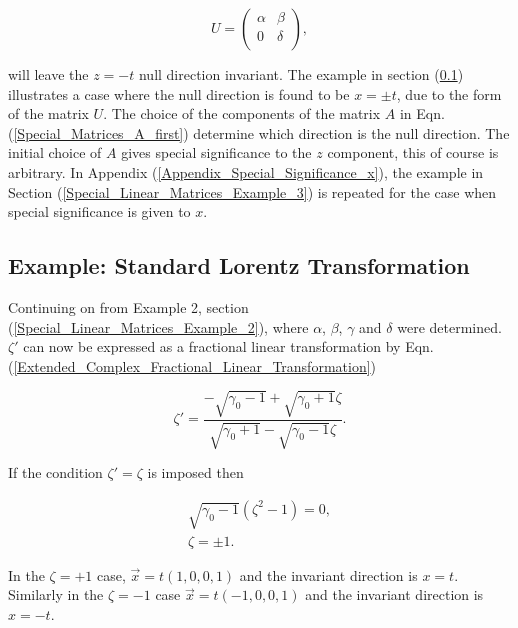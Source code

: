 \begin{equation*}   
U = 
\left(
\begin{array}{cc}
\alpha & \beta \\
0 & \delta \\
\end{array}
\right),
\end{equation*}   

\noindent will leave the $z=-t$ null direction invariant. The example in section (\ref{Ext_Complex_Ex_end}) illustrates a case where the null direction is found to be $x=\pm t$, due to the form of the matrix $U$. The choice of the components of the matrix $A$ in Eqn.(\ref{Special_Matrices_A_first}) determine which direction is the null direction. The initial choice of $A$ gives special significance to the $z$ component, this of course is arbitrary. In Appendix (\ref{Appendix_Special_Significance_x}), the example in Section (\ref{Special_Linear_Matrices_Example_3}) is repeated for the case when special significance is given to $x$. 

\subsection{Example: Standard Lorentz Transformation}\label{Ext_Complex_Ex_end}

Continuing on from Example 2, section (\ref{Special_Linear_Matrices_Example_2}), where $\alpha$, $\beta$, $\gamma$ and $\delta$ were determined. $\zeta'$ can now be expressed as a fractional linear transformation by Eqn.(\ref{Extended_Complex_Fractional_Linear_Transformation})

\begin{equation*} 
\zeta' = \frac{-\sqrt{\gamma_0 - 1} + \sqrt{\gamma_0 + 1}\zeta}{\sqrt{\gamma_0 + 1} - \sqrt{\gamma_0 - 1}\zeta}.
\end{equation*}

\noindent If the condition $\zeta' = \zeta$ is imposed then

\begin{gather*}
\sqrt{\gamma_0 - 1}(\zeta^2 - 1) = 0, \\
\zeta = \pm 1.
\end{gather*}

In the $\zeta = +1$ case, $\vec{x} = t(1,0,0,1)$ and the invariant direction is $x=t$. Similarly in the $\zeta = -1$ case $\vec{x} = t(-1,0,0,1)$ and the invariant direction is $x = - t$. 



   












